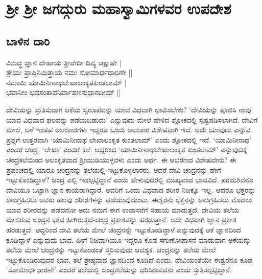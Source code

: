 \chapter*{ಶ್ರೀ ಶ್ರೀ ಜಗದ್ಗುರು ಮಹಾಸ್ವಾಮಿಗಳವರ ಉಪದೇಶ}

\section{ಬಾಳಿನ ದಾರಿ}


\begin{shloka}
ವಿಶುದ್ಧ ಜ್ಞಾನ ದೇಹಾಯ ತ್ರೀವೇದೀ ದಿವ್ಯ ಚಕ್ಷುಷೇ |\\
ಶ್ರೇಯಃ ಪ್ರಾಪ್ತಿನಿಮಿತ್ತಾಯ ನಮಃ ಸೋಮಾರ್ಧಧಾರಿಣೇ ||\\
ನಮಾಮಿ ಯಾಮಿನೀನಾಥಲೇಖಾಲಂಕೃತಕುಂತಲಾಮ್ |\\
ಭವಾನೀಂ ಭವಸಂತಾಪನಿರ್ವಾಪಣಸುಧಾನದೀಮ್ ||
\end{shloka}


ದೇವಿಯನ್ನು ಸ್ತುತಿಸುವಾಗ ಆಕೆಯ ಸ್ವರೂಪವನ್ನು ಯಾವ ವಿಧವಾಗಿ ಭಾವಿಸಬೇಕು? `ದೇವಿಯನ್ನು ಪೂಜಿಸಿ ನಾವು ಯಾವ 
ವಿಧವಾದ ಫಲವನ್ನು ಪಡೆಯಬಹುದು' ಎನ್ನುವುದು ಮೇಲೆ ಹೇಳಿದ ಶ್ಲೋಕದಲ್ಲಿ ಸ್ಪಷ್ಟಪಡಿಸಲಾಗಿದೆ. ದೇವಿಗೆ 
ಮಾಲೆ, ಬಳೆ ಇಂತಹ ಅಲಂಕಾರಗಳು ಇದ್ದರೂ ಒಂದು ಅಲಂಕಾರ ವಿಶೇಷವಾಗಿ ಇದೆ. ಅದು ಯಾವುದು ಎನ್ನುವ ಪ್ರಶ್ನೆಗೆ 
ಉತ್ತರವಾಗಿ `ಯಾಮಿನೀನಾಥ ಲೇಖಾಲಂಕೃತ ಕುಂತಲಾಮ್' ಎಂದು ಶ್ಲೋಕದಲ್ಲಿ ಇದೆ. `ಯಾಮಿನೀನಾಥ' 
ಎಂದರೆ ಚಂದ್ರ. `ಲೇಖಾ' ಎಂದರೆ ಕಲೆ. ಆದ್ದರಿಂದ `ಯಾಮಿನೀನಾಥಲೇಖಾಲಂಕೃತ ಕುಂತಲಾಮ್' ಎನ್ನುವುದಕ್ಕೆ 
ಚಂದ್ರಕಲೆಯಿಂದ ಅಲಂಕೃತವಾದ ಶ್ರೀಮುಡಿಯುಳ್ಳವಳು ಎಂದು ಅರ್ಥ. ಈ ಆಭರಣದ ವಿಶೇಷವೇನು? ಈ 
ಪ್ರಪಂಚದಲ್ಲಿ ಯಾರೂ ಚಂದ್ರನನ್ನು ತಲೆಯಲ್ಲಿ ಇಟ್ಟುಕೊಳ್ಳಲಾರರು. ಆದರೆ ದೇವಿ ಚಂದ್ರನನ್ನು ಹೇಗೆ ಇಟ್ಟುಕೊಂಡಿದ್ದಾಳೆ? ಚಂದ್ರ 
ಎಲ್ಲಿ ಇಡಲ್ಪಟ್ಟಿದ್ದಾನೆ ಎಂದು ಹೇಳುವುದರಲ್ಲಿ ಮುಖ್ಯವಾದ ಭಾವವಿದೆ. ಪರಮಶಿವನೂ ದೇವಿಯೂ ಒಟ್ಟಾಗಿ 
ಜ್ಞಾನ ಕಾಯರಾಗಿದ್ದಾರೆ. ಅವರಿಗೆ ಒಂದು ವಿಧವಾದ ಶರೀರ ನಿಜಕ್ಕೂ ಇಲ್ಲ. ಆದರೂ ಭಕ್ತರನ್ನು ಅನುಗ್ರಹಿಸಲು 
ಅವರು ಹಲವು ಶರೀರಗಳನ್ನು ಪಡೆಯುವುದುಂಟು. ಈಶ್ವರನು ಭಕ್ತನನ್ನು ಅನುಗ್ರಹಿಸಲು ಮೊದಲು ಯಾವ ಶರೀರವನ್ನು 
ಪಡೆದನೋ ಅದು ನಮಗೆ ಈಗ ಉಪಾಸನೆಗೆ ಸಹಾಯ ಮಾಡುತ್ತದೆ. ದೇವಿಯ ತಲೆಯ ಮೇಲಿರುವ ಚಂದ್ರನ 
ಭಾವ ಹೀಗಿರುತ್ತದೆ-ಚಂದ್ರ ಪ್ರಕಾಶವನ್ನು ಹರಡುತ್ತಾನೆ. ಅದೇ ವಿಧವಾಗಿ ಜ್ಞಾನ ಪ್ರಕಾಶ ಹರಡುತ್ತದೆ. ಆದ್ದರಿಂದ ದೇವಿ 
ತಲೆಯ ಮೇಲೆ ಚಂದ್ರನನ್ನು ಇಟ್ಟುಕೊಂಡಿದ್ದಾಳೆ ಎನ್ನುವುದಕ್ಕೆ ಆಕೆ ಜ್ಞಾನದಿಂದ ಕೂಡಿದ್ದಾಳೆ ಎನ್ನುವುದು ಭಾವ. ಹೀಗೆ 
ನಿಜವಾಗಿಯೂ ಇದ್ದರೂ ಕೂಡ ಸಗುಣೋಪಾಸನೆ ಮಾಡುವಾಗ ಆಕೆಯನ್ನು ತಲೆಯ ಮೇಲೆ ಚಂದ್ರನನ್ನು ಇಟ್ಟುಕೊಂಡಂತೆ 
ಸ್ಮರಿಸುವುದು ಆವಶ್ಯಕ. ಚಂದ್ರನನ್ನು ತಲೆಯ ಮೇಲೆ ಇಟ್ಟುಕೊಂಡಿರುವುದರ ಭಾವ, ತಲೆ ಶ್ರೇಷ್ಠವಾದ ಜ್ಞಾನದಿಂದ 
ಕೂಡಿದೆ ಎಂದು. ದೇವಿಯಂತೆಯೇ ಈಶ್ವರನೂ ಕೂಡ `ಸೋಮಾರ್ಧಧಾರಣೇ' ಎಂದರೆ ತಲೆಯಲ್ಲಿ ಚಂದ್ರಕಲೆಯನ್ನು ಧರಿಸಿರುವವನು ಎಂದು ಸ್ತುತಿಸಲ್ಪಟ್ಟಿದ್ದಾನೆ.

